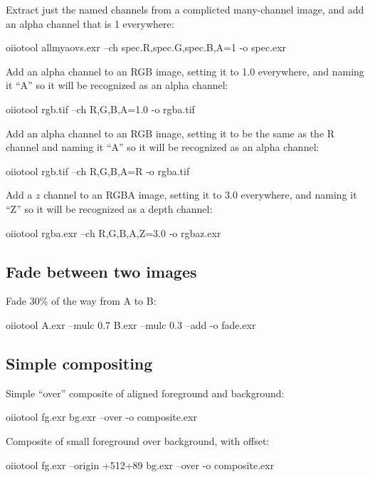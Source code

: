 \noindent Extract just the named channels from a complicted many-channel
image, and add an alpha channel that is 1 everywhere:
\begin{code}
    oiiotool allmyaovs.exr --ch spec.R,spec.G,spec.B,A=1 -o spec.exr
\end{code}

\noindent Add an alpha channel to an RGB image, setting it to 1.0 everywhere,
and naming it ``A'' so it will be recognized as an alpha channel:
\begin{code}
    oiiotool rgb.tif --ch R,G,B,A=1.0 -o rgba.tif
\end{code}

\noindent Add an alpha channel to an RGB image, setting it to be the same
as the R channel and naming it ``A'' so it will be recognized as an alpha channel:
\begin{code}
    oiiotool rgb.tif --ch R,G,B,A=R -o rgba.tif
\end{code}

\noindent Add a $z$ channel to an RGBA image, setting it to 3.0 everywhere,
and naming it ``Z'' so it will be recognized as a depth channel:
\begin{code}
    oiiotool rgba.exr --ch R,G,B,A,Z=3.0 -o rgbaz.exr
\end{code}


\subsection*{Fade between two images}

\noindent Fade 30\% of the way from A to B:

\begin{code}
    oiiotool A.exr --mulc 0.7 B.exr --mulc 0.3 --add -o fade.exr
\end{code}


\subsection*{Simple compositing}

\noindent Simple ``over'' composite of aligned foreground and background:

\begin{code}
    oiiotool fg.exr bg.exr --over -o composite.exr
\end{code}

\noindent Composite of small foreground over background, with offset:

\begin{code}
    oiiotool fg.exr --origin +512+89 bg.exr --over -o composite.exr
\end{code}


